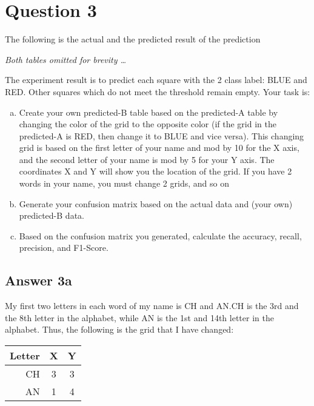 \documentclass[
  11pt, %
]{assignment}
\begin{document}
\section*{Question 3}
\begin{problem}
The following is the actual and the predicted result of the prediction

\medskip

\textit{Both tables omitted for brevity \ldots}

\medskip

The experiment result is to predict each square with the 2 class label: BLUE and RED. Other squares which do not meet the threshold remain empty. Your task is:

\begin{enumerate}[a.]
	\item Create your own predicted-B table based on the predicted-A table by changing the color of the grid to the opposite color (if the grid in the predicted-A is RED, then change it to BLUE and vice versa). This changing grid is based on the first letter of your name and mod by 10 for the X axis, and the second letter of your name is mod by 5 for your Y axis. The coordinates X and Y will show you the location of the grid. If you have 2 words in your name, you must change 2 grids, and so on
	\item Generate your confusion matrix based on the actual data and (your own) predicted-B data.
	\item Based on the confusion matrix you generated, calculate the accuracy, recall, precision, and F1-Score.
\end{enumerate}

\end{problem}

\subsection*{Answer 3a}

My first two letters in each word of my name is CH and AN.\@ CH is the 3rd and the 8th letter in the alphabet, while AN is the 1st and 14th letter in the alphabet. Thus, the following is the grid that I have changed:

\begin{center}
	\begin{tabular}{r | c c}
		Letter & X & Y \\
		\toprule
		CH     & 3 & 3 \\
		AN     & 1 & 4 \\
	\end{tabular}
\end{center}
\end{document}
